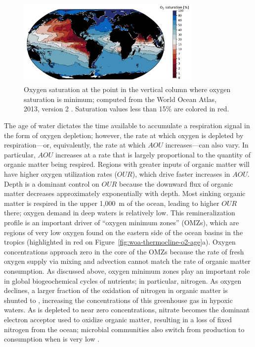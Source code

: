 \documentclass[draft,linenumbers]{report_chapter}
\begin{document}
\begin{figure}[tbp]
\centering
\includegraphics[width=0.8\textwidth]{woa-column-min-o2-sat.pdf}
\caption{Oxygen saturation at the point in the vertical column where oxygen saturation is minimum; computed from the World Ocean Atlas, 2013, version 2 \protect\citep{Garcia-Locarnini-etal-2014}.
Saturation values less than 15\% are colored in red.}
\label{fig:woa-o2-column-min}
\end{figure}

The age of water dictates the time available to accumulate a respiration signal in the form of oxygen depletion; however, the rate at which oxygen is depleted by respiration---or, equivalently, the rate at which $AOU$ increases---can also vary.
In particular, $AOU$ increases at a rate that is largely proportional to the quantity of organic matter being respired.
Regions with greater inputs of organic matter will have higher oxygen utilization rates ($OUR$), which drive faster increases in $AOU$.
Depth is a dominant control on $OUR$ because the downward flux of organic matter decreases approximately exponentially with depth.
Most sinking organic matter is respired in the upper 1,000~m of the ocean, leading to higher $OUR$ there; oxygen demand in deep waters is relatively low.
This remineralization profile is an important driver of ``oxygen minimum zones'' (OMZs), which are regions of very low oxygen found on the eastern side of the ocean basins in the tropics (highlighted in red on Figure~\ref{fig:woa-thermocline-o2-age}a).
Oxygen concentrations approach zero in the core of the OMZs because the rate of fresh oxygen supply via mixing and advection cannot match the rate of organic matter consumption.
As discussed above, oxygen minimum zones play an important role in global biogeochemical cycles of nutrients; in particular, nitrogen.
As oxygen declines, a larger fraction of the oxidation of nitrogen in organic matter is shunted to , increasing the concentrations of this greenhouse gas in hypoxic waters.
As  is depleted to near zero concentrations, nitrate becomes the dominant electron acceptor used to oxidize organic matter, resulting in a loss of fixed nitrogen from the ocean; microbial communities also switch from  production to consumption when  is very low \citep{Codispoti-2010}.
\end{document}
